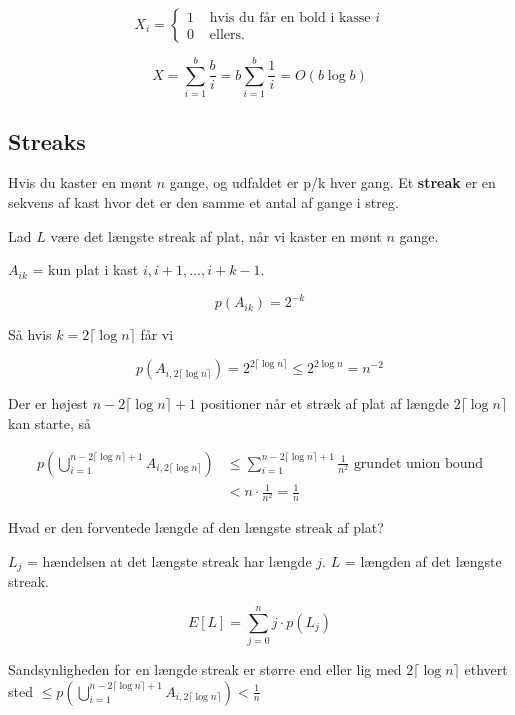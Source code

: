 \documentclass[11pt]{article}
\theoremstyle{definition}
\theoremstyle{remark}
\begin{document}
\[
X_{i} = \begin{cases}
  1 & \text{ hvis  du får en bold i kasse }i \\
  0 & \text{ ellers.}
\end{cases}
\]

\[
X = \sum_{i=1}^{b} \frac{b}{i} = b \sum_{i=1}^{b} \frac{1}{i} = O(b \log b)
\]


\subsection{Streaks}
\label{subsec:label}

Hvis du kaster en mønt $n$ gange, og udfaldet er p/k hver gang. Et \textbf{streak} er en sekvens af kast hvor det er den samme et antal af gange i streg.

Lad $L$ være det længste streak af plat, når vi kaster en mønt $n$ gange.

$A_{ik}$ = kun plat i kast $i, i+1, \ldots, i+k-1$.

\[
p(A_{ik}) = 2^{-k}
\]


Så hvis $k = 2 \lceil \log n \rceil $ får vi

\[
p(A_{i, 2 \lceil \log n \rceil}) = 2^{2 \lceil \log n \rceil} \leq 2^{2 \log n} = n^{-2}
\]

Der er højest $n - 2 \lceil \log n \rceil  + 1$ positioner når et stræk af plat af længde $2 \lceil \log n \rceil$ kan starte, så

\begin{equation}
  \label{}
\begin{split}
  p(\bigcup\limits_{i=1}^{n- 2 \lceil \log n \rceil +1}A_{i, 2 \lceil \log n \rceil}) &\leq  \sum_{i=1}^{n - 2 \lceil \log n \rceil +1} \frac{1}{n^{2}} \text{ grundet union bound}\\
  &< n \cdot \frac{1}{n^{2}} = \frac{1}{n}
\end{split}
\end{equation}

Hvad er den forventede længde af den længste streak af plat?

$L_{j}$ = hændelsen at det længste streak har længde $j$. $L$ = længden af det længste streak.

\[
E[L] = \sum_{j=0}^{n} j \cdot p (L_{j})
\]

Sandsynligheden for en længde streak er større end eller lig med $2 \lceil \log n \rceil$ ethvert sted $\leq p ( \bigcup\limits_{i=1}^{n-2 \lceil \log n \rceil + 1} A_{i, 2 \lceil \log n \rceil} ) < \frac{1}{n}$
\end{document}
